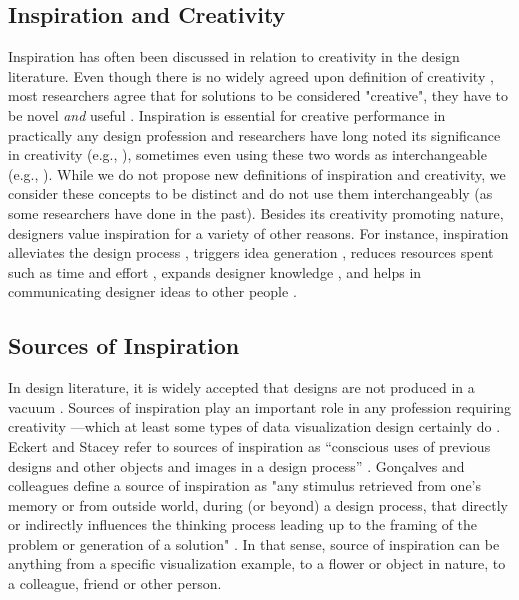 \subsection{Inspiration and Creativity}
Inspiration has often been discussed in relation to creativity in the design literature. Even though there is no widely agreed upon definition of creativity \cite{silvia_creativity_2010}, most researchers agree that for solutions to be considered "creative", they have to be novel \textit{and} useful \cite{feist_meta-analysis_1998, sarkar_assessing_2011}. Inspiration is essential for creative performance in practically any design profession and researchers have long noted its significance in creativity (e.g., \cite{eckert_sources_2000, goncalves_what_2014, herring_getting_2009, koronis_crafting_2021}), sometimes even using these two words as interchangeable (e.g., \cite{chamorro-premuzic_creativity_2006}). While we do not propose new definitions of inspiration and creativity, we consider these concepts to be distinct and do not use them interchangeably (as some researchers have done in the past). Besides its creativity promoting nature, designers value inspiration for a variety of other reasons. For instance, inspiration alleviates the design process \cite{mete_creative_2006}, triggers idea generation \cite{koronis_crafting_2021, petre_complexity_2006}, reduces resources spent such as time and effort \cite{cai_extended_2010}, expands designer knowledge \cite{goncalves_inspiration_2016}, and helps in communicating designer ideas to other people \cite{eckert_sources_2000, petre_complexity_2006}. 

\subsection{Sources of Inspiration}
In design literature, it is widely accepted that designs are not produced in a vacuum \cite{eckert_adaptation_2003}. Sources of inspiration play an important role in any profession requiring creativity \cite{eckert_sources_2003, yang_design_2005}---which at least some types of data visualization design certainly do \cite{parsons_fixation_2021,bako_understanding_2022,mendez_bottom-up_2017, li_data_2018, dignazio_creative_2017}. Eckert and Stacey refer to sources of inspiration as ``conscious uses of previous designs and other objects and images in a design process'' \cite[p. 524]{eckert_sources_2000}. Gon\c{c}alves and colleagues define a source of inspiration as "any stimulus retrieved from one's memory or from outside world, during (or beyond) a design process, that directly or indirectly influences the thinking process leading up to the framing of the problem or generation of a solution" \cite[p. 3]{goncalves_inspiration_2016}. In that sense, source of inspiration can be anything from a specific visualization example, to a flower or object in nature, to a colleague, friend or other person. 

